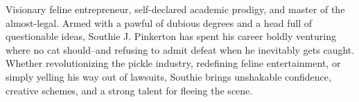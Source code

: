

\begin{cvparagraph}

Visionary feline entrepreneur, self-declared academic prodigy,
and master of the almost-legal. Armed with a pawful of dubious
degrees and a head full of questionable ideas, Southie J.
Pinkerton has spent his career boldly venturing where no
cat should--and refusing to admit defeat when he inevitably
gets caught. Whether revolutionizing the pickle industry,
redefining feline entertainment, or simply yelling his way
out of lawsuits, Southie brings unshakable confidence, creative
schemes, and a strong talent for fleeing the scene.

\end{cvparagraph}
